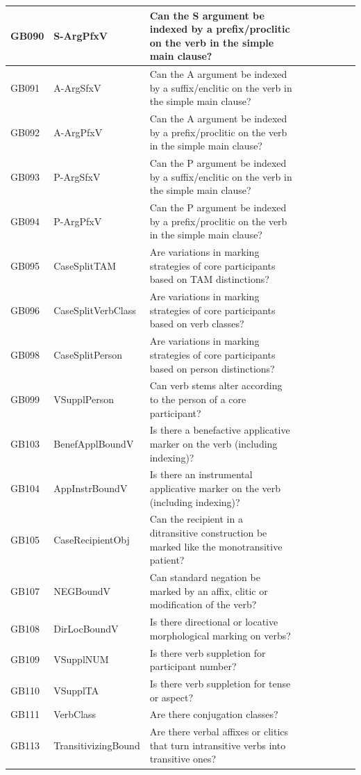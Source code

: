 \documentclass[draft,10pt]{article} %
\begin{document}
\begin{landscape}
\begin{longtable}{| l | p{4cm}| p{12cm}|p{2cm}|p{2cm}|p{2cm}|p{2cm}|p{2cm}|p{2cm}|}
GB090 & S-ArgPfxV&Can the S argument be indexed by a prefix/proclitic on the verb in the simple main clause?\\ \hline
GB091 & A-ArgSfxV&Can the A argument be indexed by a suffix/enclitic on the verb in the simple main clause?\\ \hline
GB092 & A-ArgPfxV&Can the A argument be indexed by a prefix/proclitic on the verb in the simple main clause?\\ \hline
GB093 & P-ArgSfxV&Can the P argument be indexed by a suffix/enclitic on the verb in the simple main clause?\\ \hline
GB094 & P-ArgPfxV&Can the P argument be indexed by a prefix/proclitic on the verb in the simple main clause?\\ \hline
GB095 & CaseSplitTAM&Are variations in marking strategies of core participants based on TAM distinctions?\\ \hline
GB096 & CaseSplitVerbClass&Are variations in marking strategies of core participants based on verb classes?\\ \hline
GB098 & CaseSplitPerson&Are variations in marking strategies of core participants based on person distinctions?\\ \hline
GB099 & VSupplPerson&Can verb stems alter according to the person of a core participant?\\ \hline
GB103 & BenefApplBoundV&Is there a benefactive applicative marker on the verb (including indexing)?\\ \hline
GB104 & AppInstrBoundV&Is there an instrumental applicative marker on the verb (including indexing)?\\ \hline
GB105 & CaseRecipientObj&Can the recipient in a ditransitive construction be marked like the monotransitive patient?\\ \hline
GB107 & NEGBoundV&Can standard negation be marked by an affix, clitic or modification of the verb?\\ \hline
GB108 & DirLocBoundV&Is there directional or locative morphological marking on verbs?\\ \hline
GB109 & VSupplNUM&Is there verb suppletion for participant number?\\ \hline
GB110 & VSupplTA&Is there verb suppletion for tense or aspect?\\ \hline
GB111 & VerbClass&Are there conjugation classes?\\ \hline
GB113 & TransitivizingBound&Are there verbal affixes or clitics that turn intransitive verbs into transitive ones?\\ \hline

\end{longtable}
\end{landscape}
\end{document}
